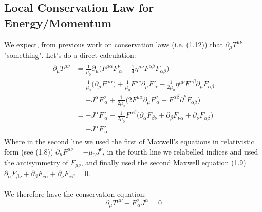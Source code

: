 \documentclass[a4paper]{article}
\numberwithin{equation}{section}
\begin{document}
\subsection{Local Conservation Law for Energy/Momentum}
We expect, from previous work on conservation laws (i.e. (1.12)) that $\partial_\mu T^{\mu \nu}=$ "something". Let's do a direct calculation:
\begin{align}
\begin{split}
\partial_\mu T^{\mu \nu}&=\frac{1}{\mu_0}\partial_\mu\big(F^{\mu\alpha}F^\nu_{ \ \alpha} - \frac{1}{4}\eta^{\mu \nu}F^{\alpha \beta}F_{\alpha \beta} \big) \\
&=\frac{1}{\mu_0}\bigg(\partial_\mu F^{\mu \alpha} \bigg)+\frac{1}{\mu_0}F^{\mu \nu}\partial_\mu F^\nu_{\ \alpha} - \frac{1}{2\mu_0}\eta^{\mu \nu}F^{\alpha \beta}\partial_\mu F_{\alpha \beta} \\
&=-J^\alpha F^\nu_{\ \alpha}+\frac{1}{2\mu_0}\big(2F^{\mu \alpha}\partial_\mu F^\nu_{\ \alpha} - F^{\alpha \beta} \partial^{\nu}F_{\alpha \beta} \big) \\
&=-J^\alpha F^\nu_{\ \alpha} -\frac{1}{2\mu_0}F^{\alpha \beta}\big(\partial_\alpha F_{\beta \nu} + \partial_\beta F_{\nu \alpha} + \partial_\nu F_{\alpha \beta} \big) \\
&=-J^\alpha F^\nu_{\ \alpha} 
\end{split}
\end{align}
Where in the second line we used the first of Maxwell's equations in relativistic form (see (1.8)) $\partial_\mu F^{\mu \nu} = - \mu_0 J^\nu$, in the fourth line we relabelled indices and used the antisymmetry of $F_{\mu \nu}$, and finally used the second Maxwell equation (1.9) $\partial_\alpha F_{\beta \nu} + \partial_\beta F_{\nu \alpha} + \partial_\nu F_{\alpha \beta}=0$.\\
\\
We therefore have the conservation equation:
\begin{equation}
\partial_\mu T^{\mu \nu} + F^\nu_{\ \alpha}J^\alpha = 0
\end{equation}
\end{document}
